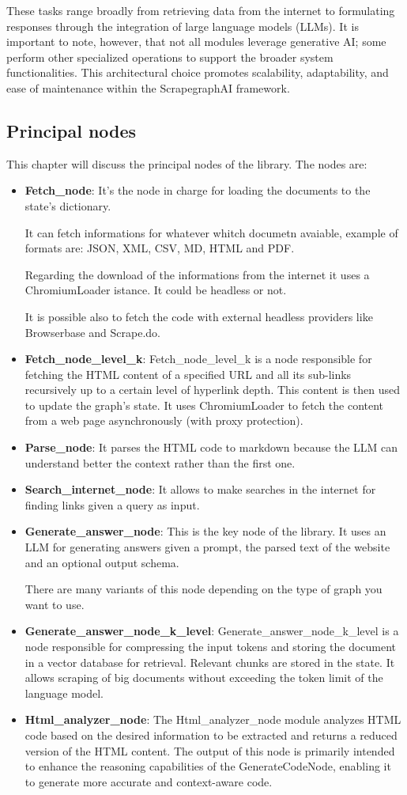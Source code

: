 These tasks range broadly from retrieving data from the internet to formulating responses through the integration of large language models (LLMs). It is important to note, however, that not all modules leverage generative AI; some perform other specialized operations to support the broader system functionalities. This architectural choice promotes scalability, adaptability, and ease of maintenance within the ScrapegraphAI  framework.
\subsection{Principal nodes}
This chapter will discuss the principal nodes of the library. 
The nodes are:
\begin{itemize}
    \item \textbf{Fetch\_node}: It's the node in charge for loading the documents to the state's dictionary.

It can fetch informations for whatever whitch documetn avaiable, example of formats are: JSON, XML, CSV, MD, HTML and PDF.

Regarding the download of the informations from the internet it uses a ChromiumLoader istance. It could be headless or not.

It is possible  also to fetch the code with external headless providers like Browserbase and Scrape.do.
    \item \textbf{Fetch\_node\_level\_k}: Fetch\_node\_level\_k is a node responsible for fetching the HTML content of a specified URL and all its sub-links recursively up to a certain level of hyperlink depth. This content is then used to update the graph's state. It uses ChromiumLoader to fetch the content from a web page asynchronously (with proxy protection).
    \item \textbf{Parse\_node}: It parses the HTML code to markdown because the LLM can understand better the context rather than the first one.
    \item \textbf{Search\_internet\_node}: It allows to make searches in the internet for finding links given a query as input.
    \item \textbf{Generate\_answer\_node}: This is the key node of the library. It uses an LLM for generating answers given a prompt, the parsed text of the website and an optional output schema.

There are many variants of this node depending on the type of graph you want to use.
    \item \textbf{Generate\_answer\_node\_k\_level}: Generate\_answer\_node\_k\_level is a node responsible for compressing the input tokens and storing the document in a vector database for retrieval. Relevant chunks are stored in the state. It allows scraping of big documents without exceeding the token limit of the language model.
    \item \textbf{Html\_analyzer\_node}: The Html\_analyzer\_node module analyzes HTML code based on the desired information to be extracted and returns a reduced version of the HTML content. The output of this node is primarily intended to enhance the reasoning capabilities of the GenerateCodeNode, enabling it to generate more accurate and context-aware code.


\end{itemize}
